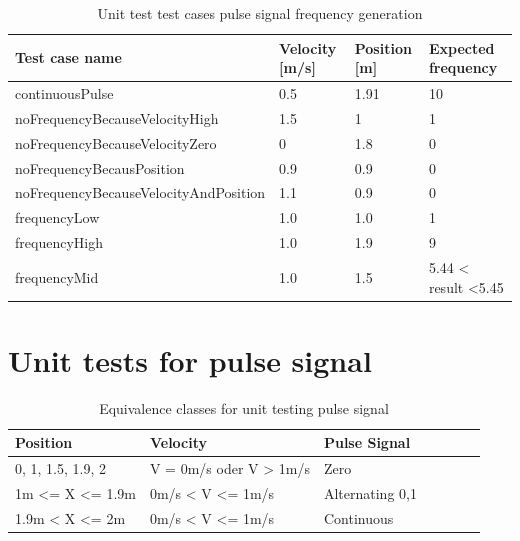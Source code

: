 \begin{table}[H]
\centering
\caption{Unit test test cases pulse signal frequency generation}
\begin{adjustbox}{width=1\textwidth, center=\textwidth}
\renewcommand{\arraystretch}{1}
\begin{tabular}{llll}
\textbf{Test case name}               & \textbf{Velocity {[}m/s{]}} & \textbf{Position {[}m{]}} & \textbf{Expected frequency} \\ \hline
continuousPulse                       & 0.5                         & 1.91                      & 10                                    \\
noFrequencyBecauseVelocityHigh        & 1.5                         & 1                         & 1                                     \\
noFrequencyBecauseVelocityZero        & 0                           & 1.8                       & 0                                     \\
noFrequencyBecausPosition             & 0.9                         & 0.9                       & 0                                     \\
noFrequencyBecauseVelocityAndPosition & 1.1                         & 0.9                       & 0                                     \\
frequencyLow                          & 1.0                         & 1.0                       & 1                                     \\
frequencyHigh                         & 1.0                         & 1.9                       & 9                                     \\
frequencyMid                          & 1.0                         & 1.5                       & 5.44 < result \textless 5.45 
\end{tabular}
\end{adjustbox}
\end{table}

\section{Unit tests for pulse signal}

\begin{table}[H]
\centering
\caption{Equivalence classes for unit testing pulse signal}
\begin{adjustbox}{width=1\textwidth, center=\textwidth}
\renewcommand{\arraystretch}{1}
\begin{tabular}{lllllll}
\textbf{Position} & \textbf{Velocity} & \textbf{Pulse Signal} \\\hline
{0, 1, 1.5, 1.9, 2} & V = 0m/s oder V > 1m/s & Zero\\
1m <= X <= 1.9m  & 0m/s < V <= 1m/s & Alternating 0,1\\
1.9m < X <= 2m  & 0m/s < V <= 1m/s &Continuous
\end{tabular}
\end{adjustbox}
\end{table}

